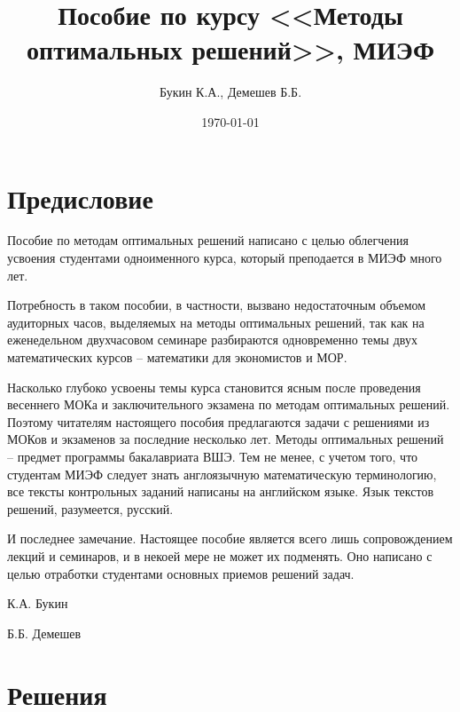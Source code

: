 \documentclass[a4paper,12pt]{article}
\title{Пособие по курсу <<Методы оптимальных решений>>, МИЭФ}
\author{Букин К.А., Демешев Б.Б.}
\date{\today}
\begin{document}
\maketitle %
\tableofcontents


\section*{Предисловие}

Пособие по методам оптимальных решений написано с целью облегчения усвоения студентами одноименного курса, который преподается в МИЭФ много лет.

Потребность в таком пособии, в частности, вызвано недостаточным объемом аудиторных часов, выделяемых на методы оптимальных решений, так как на еженедельном двухчасовом семинаре разбираются одновременно темы двух математических курсов – математики для экономистов и МОР.

Насколько глубоко усвоены темы курса становится ясным после проведения весеннего МОКа и заключительного экзамена по методам оптимальных решений. Поэтому читателям настоящего пособия предлагаются задачи с решениями из МОКов и экзаменов за последние несколько лет.
Методы оптимальных решений – предмет программы бакалавриата ВШЭ. Тем не менее, с учетом того, что студентам МИЭФ следует знать англоязычную математическую терминологию, все тексты контрольных заданий написаны на английском языке. Язык текстов решений, разумеется, русский.

И последнее замечание.  Настоящее пособие является всего лишь сопровождением лекций и семинаров, и в некоей мере не может их подменять. Оно написано с целью отработки студентами основных приемов решений задач.

К.А. Букин

Б.Б. Демешев


\problemonly


\restoresection
\section{Решения}

\solutiononly

\end{document}
